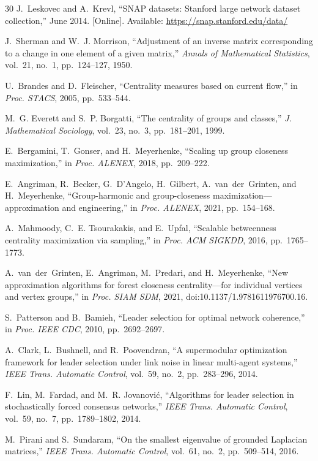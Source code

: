 \begin{thebibliography}{30}
J.~Leskovec and A.~Krevl,
``SNAP datasets: Stanford large network dataset collection,''
June 2014. [Online]. Available: \url{https://snap.stanford.edu/data/}


J.~Sherman and W.~J. Morrison,
``Adjustment of an inverse matrix corresponding to a change in one
element of a given matrix,''
\emph{Annals of Mathematical Statistics}, vol.~21, no.~1,
pp.~124--127, 1950.


U.~Brandes and D.~Fleischer,
``Centrality measures based on current flow,''
in \emph{Proc. STACS}, 2005, pp.~533--544.

M.~G. Everett and S.~P. Borgatti,
``The centrality of groups and classes,''
\emph{J. Mathematical Sociology}, vol.~23, no.~3, pp.~181--201, 1999.

E.~Bergamini, T.~Gonser, and H.~Meyerhenke,
``Scaling up group closeness maximization,''
in \emph{Proc. ALENEX}, 2018, pp.~209--222.

E.~Angriman, R.~Becker, G.~D'Angelo, H.~Gilbert, A.~van~der~Grinten,
and H.~Meyerhenke,
``Group-harmonic and group-closeness maximization---approximation and
engineering,'' in \emph{Proc. ALENEX}, 2021, pp.~154--168.

A.~Mahmoody, C.~E. Tsourakakis, and E.~Upfal,
``Scalable betweenness centrality maximization via sampling,''
in \emph{Proc. ACM SIGKDD}, 2016, pp.~1765--1773.

A.~van~der~Grinten, E.~Angriman, M.~Predari, and H.~Meyerhenke,
``New approximation algorithms for forest closeness centrality---for
individual vertices and vertex groups,''
in \emph{Proc. SIAM SDM}, 2021, doi:10.1137/1.9781611976700.16.

S.~Patterson and B.~Bamieh,
``Leader selection for optimal network coherence,''
in \emph{Proc. IEEE CDC}, 2010, pp.~2692--2697.

A.~Clark, L.~Bushnell, and R.~Poovendran,
``A supermodular optimization framework for leader selection under
link noise in linear multi-agent systems,''
\emph{IEEE Trans. Automatic Control}, vol.~59, no.~2, pp.~283--296, 2014.

F.~Lin, M.~Fardad, and M.~R. Jovanovi\'c,
``Algorithms for leader selection in stochastically forced consensus
networks,'' \emph{IEEE Trans. Automatic Control}, vol.~59, no.~7,
pp.~1789--1802, 2014.

M.~Pirani and S.~Sundaram,
``On the smallest eigenvalue of grounded Laplacian matrices,''
\emph{IEEE Trans. Automatic Control}, vol.~61, no.~2, pp.~509--514, 2016.

\end{thebibliography}
